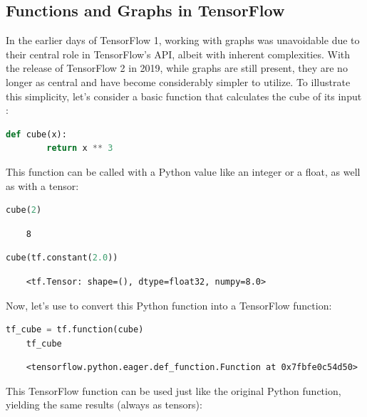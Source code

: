\subsection{Functions and Graphs in TensorFlow}

In the earlier days of TensorFlow 1, working with graphs was unavoidable due to their central role in TensorFlow’s API, albeit with inherent complexities. With the release of TensorFlow 2 in 2019, while graphs are still present, they are no longer as central and have become considerably simpler to utilize. To illustrate this simplicity, let's consider a basic function that calculates the cube of its input \cite{Geron:2022}:

\begin{lstlisting}[language=Python, numbers=none, caption={Python function to calculate the cube}]
	def cube(x):
		return x ** 3
\end{lstlisting}

This function can be called with a Python value like an integer or a float, as well as with a tensor:

\begin{lstlisting}[language=Python, numbers=none, caption={Calling the Python function with a Python value}]
	cube(2)
\end{lstlisting}
\begin{verbatim}
	8
\end{verbatim}

\begin{lstlisting}[language=Python, numbers=none, caption={Calling the Python function with a tensor}]
	cube(tf.constant(2.0))
\end{lstlisting}
\begin{verbatim}
	<tf.Tensor: shape=(), dtype=float32, numpy=8.0>
\end{verbatim}

Now, let’s use  to convert this Python function into a TensorFlow function:

\begin{lstlisting}[language=Python, numbers=none, caption={Converting Python function to TensorFlow function}]
	tf_cube = tf.function(cube)
	tf_cube
\end{lstlisting}
\begin{verbatim}
	<tensorflow.python.eager.def_function.Function at 0x7fbfe0c54d50>
\end{verbatim}

This TensorFlow function can be used just like the original Python function, yielding the same results (always as tensors):

